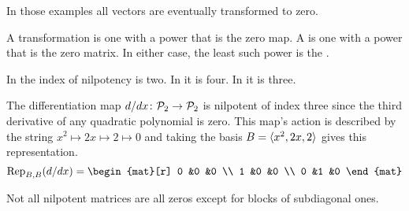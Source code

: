 In those examples all vectors are eventually transformed to
zero.

\begin{definition} \label{def:nilpotent} 
A  transformation%
is one with a power that is the zero map.
A %
is one with a power that is the zero matrix.
In either case, the least such power is the .%
\end{definition}

\begin{example}
In  the index of nilpotency is two.
In  it is four.
In  it is three.
\end{example}

\begin{example}
The differentiation map \( \mbox{$d/dx\colon \mathcal{P}_2\to \mathcal{P}_2$} \)
is nilpotent of index three since the third derivative of any quadratic
polynomial is zero.
This map's action is described by the string
$x^2\mapsto 2x\mapsto 2\mapsto 0$
and taking the basis \( B=\langle x^2,2x,2\rangle \)
gives this representation.
\begin{equation*}
  \rep{d/dx}{B,B}=
  \begin{mat}[r]
     0  &0  &0  \\
     1  &0  &0  \\
     0  &1  &0
  \end{mat}
\end{equation*}
\end{example}

Not all nilpotent matrices are all zeros except for blocks of
subdiagonal ones.

